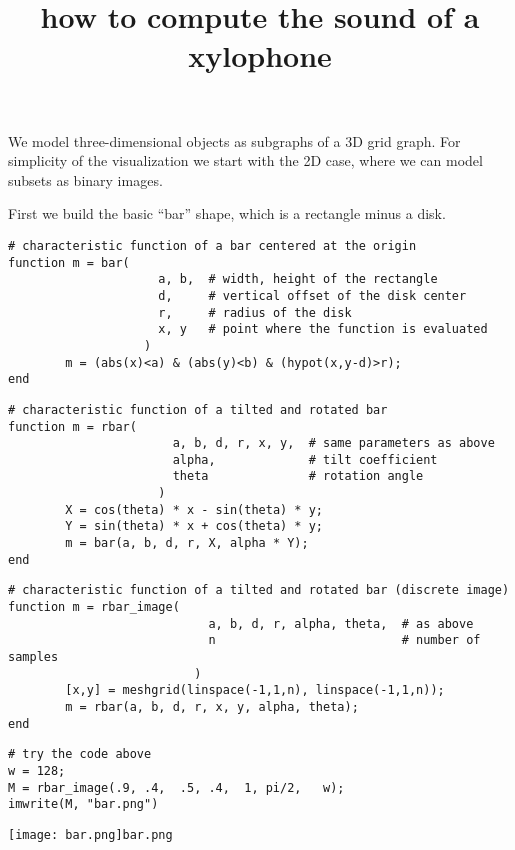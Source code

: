 \title{how to compute the sound of a xylophone}

%

We model three-dimensional objects as subgraphs of a 3D grid graph.
For simplicity of the visualization we start with the 2D case, where we can
model subsets as binary images.


First we build the basic ``bar'' shape, which is a rectangle minus a disk.

\begin{verbatim}
# characteristic function of a bar centered at the origin
function m = bar(
                     a, b,  # width, height of the rectangle
                     d,     # vertical offset of the disk center
                     r,     # radius of the disk
                     x, y   # point where the function is evaluated
                   )
        m = (abs(x)<a) & (abs(y)<b) & (hypot(x,y-d)>r);
end
\end{verbatim}

\begin{verbatim}
# characteristic function of a tilted and rotated bar
function m = rbar(
                       a, b, d, r, x, y,  # same parameters as above
                       alpha,             # tilt coefficient
                       theta              # rotation angle
                     )
        X = cos(theta) * x - sin(theta) * y;
        Y = sin(theta) * x + cos(theta) * y;
        m = bar(a, b, d, r, X, alpha * Y);
end
\end{verbatim}

\begin{verbatim}
# characteristic function of a tilted and rotated bar (discrete image)
function m = rbar_image(
                            a, b, d, r, alpha, theta,  # as above
                            n                          # number of samples
                          )
        [x,y] = meshgrid(linspace(-1,1,n), linspace(-1,1,n));
        m = rbar(a, b, d, r, x, y, alpha, theta);
end
\end{verbatim}

\begin{verbatim}
# try the code above
w = 128;
M = rbar_image(.9, .4,  .5, .4,  1, pi/2,   w);
imwrite(M, "bar.png")
\end{verbatim}

\texttt{[image: bar.png]}\verb+bar.png+

